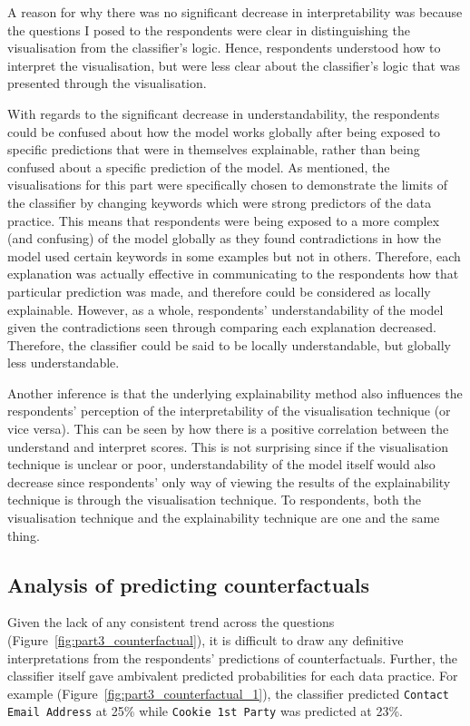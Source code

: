 A reason for why there was no significant decrease in interpretability was because the questions I posed to the respondents were clear in distinguishing the visualisation from the classifier's logic. Hence, respondents understood how to interpret the visualisation, but were less clear about the classifier's logic that was presented through the visualisation. 

With regards to the significant decrease in understandability, the respondents could be confused about how the model works globally after being exposed to specific predictions that were in themselves explainable, rather than being confused about a specific prediction of the model. As mentioned, the visualisations for this part were specifically chosen to demonstrate the limits of the classifier by changing keywords which were strong predictors of the data practice. This means that respondents were being exposed to a more complex (and confusing) of the model globally as they found contradictions in how the model used certain keywords in some examples but not in others. Therefore, each explanation was actually effective in communicating to the respondents how that particular prediction was made, and therefore could be considered as locally explainable. However, as a whole, respondents' understandability of the model given the contradictions seen through comparing each explanation decreased. Therefore, the classifier could be said to be locally understandable, but globally less understandable.

Another inference is that the underlying explainability method also influences the respondents' perception of the interpretability of the visualisation technique (or vice versa). This can be seen by how there is a positive correlation between the understand and interpret scores. This is not surprising since if the visualisation technique is unclear or poor, understandability of the model itself would also decrease since respondents' only way of viewing the results of the explainability technique is through the visualisation technique. To respondents, both the visualisation technique and the explainability technique are one and the same thing.

\subsection{Analysis of predicting counterfactuals}
Given the lack of any consistent trend across the questions (Figure~\ref{fig:part3_counterfactual}), it is difficult to draw any definitive interpretations from the respondents' predictions of counterfactuals. Further, the classifier itself gave ambivalent predicted probabilities for each data practice. For example (Figure~\ref{fig:part3_counterfactual_1}), the classifier predicted \texttt{Contact Email Address} at 25\% while \texttt{Cookie 1st Party} was predicted at 23\%.

